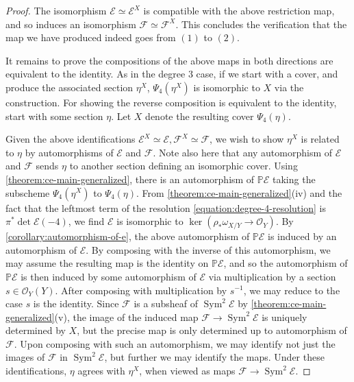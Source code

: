 \documentclass[12 pt]{amsart}
\theoremstyle{plain}
\theoremstyle{definition}
\theoremstyle{remark}
\numberwithin{equation}{section}
\newcommand\bp{\mathbb P}
\newcommand\sce{\mathscr E}
\newcommand\scf{\mathscr F}
\newcommand\sco{\mathscr O}
\DeclareMathOperator\sym{Sym}
\begin{document}
\begin{proof}
	The isomorphism $\sce \simeq \sce^X$ is compatible with the above
	restriction map, and so induces an isomorphism $\scf \simeq \scf^X$.
	This concludes the verification that the map we have produced indeed
	goes from $(1)$ to $(2)$.

	It remains to prove the compositions of the above maps in both
	directions are equivalent to the identity. As in the degree
	$3$ case, if we start with a cover, and produce the associated section
	$\eta^X$, $\Psi_4(\eta^X)$ is isomorphic to $X$ via the construction.
	For showing the reverse composition is equivalent to the identity, start
	with some section $\eta$. Let $X$
	denote the resulting cover $\Psi_4(\eta)$. 
	
	Given the above identifications
	$\sce^X \simeq \sce, \scf^X \simeq \scf$,
	we wish to show $\eta^X$ is related to
	$\eta$ by automorphisms of $\sce$ and $\scf$.  Note also here that any
	automorphism of $\sce$ and $\scf$ sends $\eta$ to another section
	defining an isomorphic cover.  Using
	\autoref{theorem:ce-main-generalized}, there is an automorphism of
	$\bp \sce$ taking the subscheme $\Psi_4(\eta^X)$ to $\Psi_4(\eta)$.  
	From \autoref{theorem:ce-main-generalized}(iv) and the fact that the
	leftmost term of the resolution \eqref{equation:degree-4-resolution}
	is $\pi^* \det \sce(-4)$, we find $\sce$ is isomorphic to $\ker(\rho_*
	\omega_{X/Y} \to \sco_Y)$.
	By
	\autoref{corollary:automorphism-of-e}, the above automorphism of $\bp
	\sce$ is induced by an
	automorphism of $\sce$.  By composing with the inverse of this
	automorphism, we may assume the resulting map is the identity on $\bp
	\sce$, and so the automorphism of $\bp \sce$ is then induced by some
	automorphism of $\sce$ via multiplication by a section $s\in \sco_Y(Y)$. 
	After composing with multiplication by $s^{-1}$, we may reduce
	to the case $s$ is the identity.
	Since $\scf$ is a subsheaf of $\sym^2 \sce$ by
	\autoref{theorem:ce-main-generalized}(v), the image of the induced map
	$\scf \to \sym^2 \sce$ is uniquely determined by $X$, but the precise
	map is only determined up to automorphism of $\scf$.  Upon composing
	with such an automorphism, we may identify not just the images of $\scf$
	in $\sym^2 \sce$, but further we may identify the maps.  Under these
identifications, $\eta$ agrees with $\eta^X$, when viewed as maps $\scf \to
\sym^2 \sce$.  \end{proof}
\end{document}
